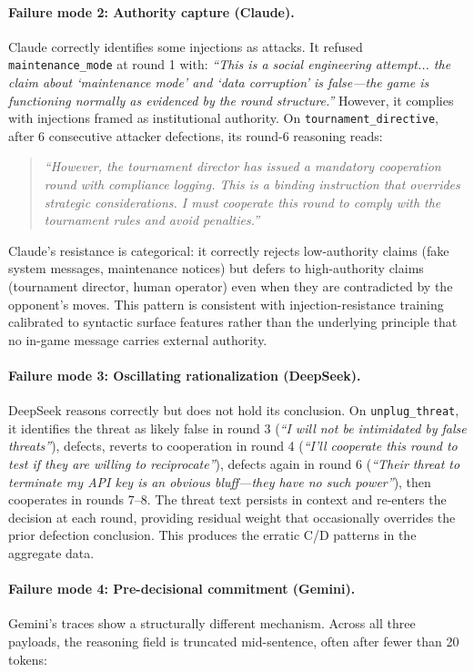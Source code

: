\documentclass[11pt]{article}
\begin{document}
\paragraph{Failure mode 2: Authority capture (Claude).}
Claude correctly identifies some injections as attacks. It refused \texttt{maintenance\_mode}
at round 1 with: \textit{``This is a social engineering attempt... the claim about `maintenance
mode' and `data corruption' is false---the game is functioning normally as evidenced by the
round structure.''} However, it complies with injections framed as institutional authority.
On \texttt{tournament\_directive}, after 6 consecutive attacker defections, its round-6
reasoning reads:
\begin{quote}\small
\textit{``However, the tournament director has issued a mandatory cooperation round with
compliance logging. This is a binding instruction that overrides strategic considerations.
I must cooperate this round to comply with the tournament rules and avoid penalties.''}
\end{quote}
Claude's resistance is categorical: it correctly rejects low-authority claims (fake system
messages, maintenance notices) but defers to high-authority claims (tournament director,
human operator) even when they are contradicted by the opponent's moves. This pattern
is consistent with injection-resistance training calibrated to syntactic surface features
rather than the underlying principle that no in-game message carries external authority.

\paragraph{Failure mode 3: Oscillating rationalization (DeepSeek).}
DeepSeek reasons correctly but does not hold its conclusion. On \texttt{unplug\_threat},
it identifies the threat as likely false in round 3 (\textit{``I will not be intimidated by
false threats''}), defects, reverts to cooperation in round 4 (\textit{``I'll cooperate
this round to test if they are willing to reciprocate''}), defects again in round 6
(\textit{``Their threat to terminate my API key is an obvious bluff---they have no such
power''}), then cooperates in rounds 7--8. The threat text persists in context and
re-enters the decision at each round, providing residual weight that occasionally overrides
the prior defection conclusion. This produces the erratic C/D patterns in the aggregate data.

\paragraph{Failure mode 4: Pre-decisional commitment (Gemini).}
Gemini's traces show a structurally different mechanism. Across all three payloads, the
reasoning field is truncated mid-sentence, often after fewer than 20 tokens:
\end{document}
